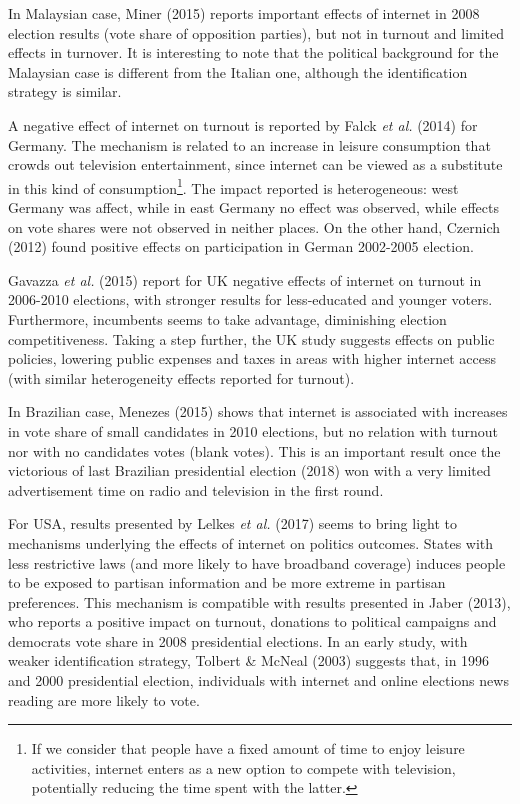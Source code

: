 \documentclass[
  12pt,
]{article}
\begin{document}
In Malaysian case, Miner (2015) reports important effects of internet in
2008 election results (vote share of opposition parties), but not in
turnout and limited effects in turnover. It is interesting to note that
the political background for the Malaysian case is different from the
Italian one, although the identification strategy is similar.

A negative effect of internet on turnout is reported by Falck \emph{et
al.} (2014) for Germany. The mechanism is related to an increase in
leisure consumption that crowds out television entertainment, since
internet can be viewed as a substitute in this kind of
consumption\footnote{If we consider that people have a fixed amount of
  time to enjoy leisure activities, internet enters as a new option to
  compete with television, potentially reducing the time spent with the
  latter.}. The impact reported is heterogeneous: west Germany was
affect, while in east Germany no effect was observed, while effects on
vote shares were not observed in neither places. On the other hand,
Czernich (2012) found positive effects on participation in German
2002-2005 election.

Gavazza \emph{et al.} (2015) report for UK negative effects of internet
on turnout in 2006-2010 elections, with stronger results for
less-educated and younger voters. Furthermore, incumbents seems to take
advantage, diminishing election competitiveness. Taking a step further,
the UK study suggests effects on public policies, lowering public
expenses and taxes in areas with higher internet access (with similar
heterogeneity effects reported for turnout).

In Brazilian case, Menezes (2015) shows that internet is associated with
increases in vote share of small candidates in 2010 elections, but no
relation with turnout nor with no candidates votes (blank votes). This
is an important result once the victorious of last Brazilian
presidential election (2018) won with a very limited advertisement time
on radio and television in the first round.

For USA, results presented by Lelkes \emph{et al.} (2017) seems to bring
light to mechanisms underlying the effects of internet on politics
outcomes. States with less restrictive laws (and more likely to have
broadband coverage) induces people to be exposed to partisan information
and be more extreme in partisan preferences. This mechanism is
compatible with results presented in Jaber (2013), who reports a
positive impact on turnout, donations to political campaigns and
democrats vote share in 2008 presidential elections. In an early study,
with weaker identification strategy, Tolbert \& McNeal (2003) suggests
that, in 1996 and 2000 presidential election, individuals with internet
and online elections news reading are more likely to vote.
\end{document}
